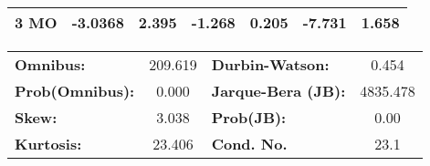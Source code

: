 \begin{center}
\begin{tabular}{lcccccc}
\textbf{3 MO}      &      -3.0368  &        2.395     &    -1.268  &         0.205        &       -7.731    &        1.658     \\
\bottomrule
\end{tabular}
\begin{tabular}{lclc}
\textbf{Omnibus:}       & 209.619 & \textbf{  Durbin-Watson:     } &    0.454  \\
\textbf{Prob(Omnibus):} &   0.000 & \textbf{  Jarque-Bera (JB):  } & 4835.478  \\
\textbf{Skew:}          &   3.038 & \textbf{  Prob(JB):          } &     0.00  \\
\textbf{Kurtosis:}      &  23.406 & \textbf{  Cond. No.          } &     23.1  \\
\bottomrule
\end{tabular}
\end{center}


